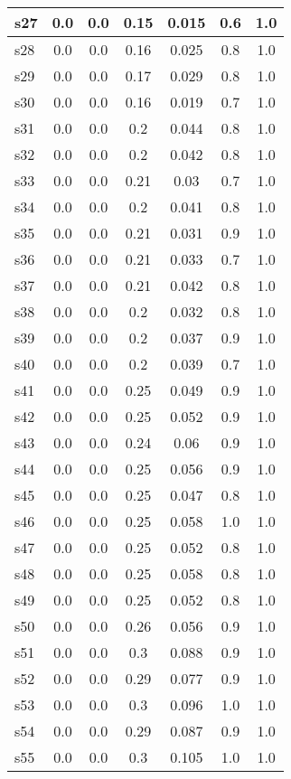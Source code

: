 \documentclass{article}
\begin{document}
\begin{tabular}{|l|c|c|c|c|c|c|}
\hline
s27 &0.0 & 0.0 & 0.15 & 0.015 & 0.6 & 1.0\\
\hline
s28 &0.0 & 0.0 & 0.16 & 0.025 & 0.8 & 1.0\\
\hline
s29 &0.0 & 0.0 & 0.17 & 0.029 & 0.8 & 1.0\\
\hline
s30 &0.0 & 0.0 & 0.16 & 0.019 & 0.7 & 1.0\\
\hline
s31 &0.0 & 0.0 & 0.2 & 0.044 & 0.8 & 1.0\\
\hline
s32 &0.0 & 0.0 & 0.2 & 0.042 & 0.8 & 1.0\\
\hline
s33 &0.0 & 0.0 & 0.21 & 0.03 & 0.7 & 1.0\\
\hline
s34 &0.0 & 0.0 & 0.2 & 0.041 & 0.8 & 1.0\\
\hline
s35 &0.0 & 0.0 & 0.21 & 0.031 & 0.9 & 1.0\\
\hline
s36 &0.0 & 0.0 & 0.21 & 0.033 & 0.7 & 1.0\\
\hline
s37 &0.0 & 0.0 & 0.21 & 0.042 & 0.8 & 1.0\\
\hline
s38 &0.0 & 0.0 & 0.2 & 0.032 & 0.8 & 1.0\\
\hline
s39 &0.0 & 0.0 & 0.2 & 0.037 & 0.9 & 1.0\\
\hline
s40 &0.0 & 0.0 & 0.2 & 0.039 & 0.7 & 1.0\\
\hline
s41 &0.0 & 0.0 & 0.25 & 0.049 & 0.9 & 1.0\\
\hline
s42 &0.0 & 0.0 & 0.25 & 0.052 & 0.9 & 1.0\\
\hline
s43 &0.0 & 0.0 & 0.24 & 0.06 & 0.9 & 1.0\\
\hline
s44 &0.0 & 0.0 & 0.25 & 0.056 & 0.9 & 1.0\\
\hline
s45 &0.0 & 0.0 & 0.25 & 0.047 & 0.8 & 1.0\\
\hline
s46 &0.0 & 0.0 & 0.25 & 0.058 & 1.0 & 1.0\\
\hline
s47 &0.0 & 0.0 & 0.25 & 0.052 & 0.8 & 1.0\\
\hline
s48 &0.0 & 0.0 & 0.25 & 0.058 & 0.8 & 1.0\\
\hline
s49 &0.0 & 0.0 & 0.25 & 0.052 & 0.8 & 1.0\\
\hline
s50 &0.0 & 0.0 & 0.26 & 0.056 & 0.9 & 1.0\\
\hline
s51 &0.0 & 0.0 & 0.3 & 0.088 & 0.9 & 1.0\\
\hline
s52 &0.0 & 0.0 & 0.29 & 0.077 & 0.9 & 1.0\\
\hline
s53 &0.0 & 0.0 & 0.3 & 0.096 & 1.0 & 1.0\\
\hline
s54 &0.0 & 0.0 & 0.29 & 0.087 & 0.9 & 1.0\\
\hline
s55 &0.0 & 0.0 & 0.3 & 0.105 & 1.0 & 1.0\\

\end{tabular}
\end{document}
